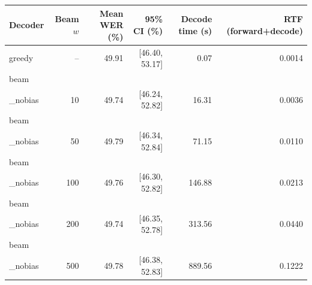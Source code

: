 \begin{tabular}{lrrrrr}
\toprule
Decoder & Beam $w$ & Mean WER (\%) & 95\% CI (\%) & Decode time (s) & RTF (forward+decode) \\
\midrule
greedy & -- & 49.91 & [46.40, 53.17] & 0.07 & 0.0014 \\
beam\\_nobias & 10 & 49.74 & [46.24, 52.82] & 16.31 & 0.0036 \\
beam\\_nobias & 50 & 49.79 & [46.34, 52.84] & 71.15 & 0.0110 \\
beam\\_nobias & 100 & 49.76 & [46.30, 52.82] & 146.88 & 0.0213 \\
beam\\_nobias & 200 & 49.74 & [46.35, 52.78] & 313.56 & 0.0440 \\
beam\\_nobias & 500 & 49.78 & [46.38, 52.83] & 889.56 & 0.1222 \\
\bottomrule
\end{tabular}
